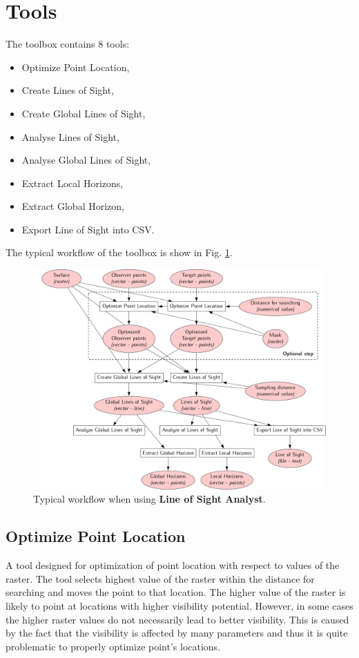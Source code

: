 \documentclass[]{article}
\begin{document}
\section{Tools}

The toolbox contains 8 tools:
\begin{itemize}
	\item Optimize Point Location,
	\item Create Lines of Sight,
	\item Create Global Lines of Sight,
	\item Analyse Lines of Sight,
	\item Analyse Global Lines of Sight,
	\item Extract Local Horizons,
	\item Extract Global Horizon,
	\item Export Line of Sight into CSV.
\end{itemize}
The typical workflow of the toolbox is show in Fig. \ref{Fig:Workflow}.

\begin{figure}
	\centering
	\includegraphics[width=\textwidth]{./images/workflow.pdf}
	\caption {Typical workflow when using \textbf{Line of Sight Analyst}.}
	\label{Fig:Workflow}
\end{figure} 

\subsection{Optimize Point Location}

A tool designed for optimization of point location with respect to values of the raster. The tool selects highest value of the raster within the distance for searching and moves the point to that location. The higher value of the raster is likely to point at locations with higher visibility potential. However, in some cases the higher raster values do not necessarily lead to better visibility. This is caused by the fact that the visibility is affected by many parameters and thus it is quite problematic to properly optimize point's locations.
\end{document}
